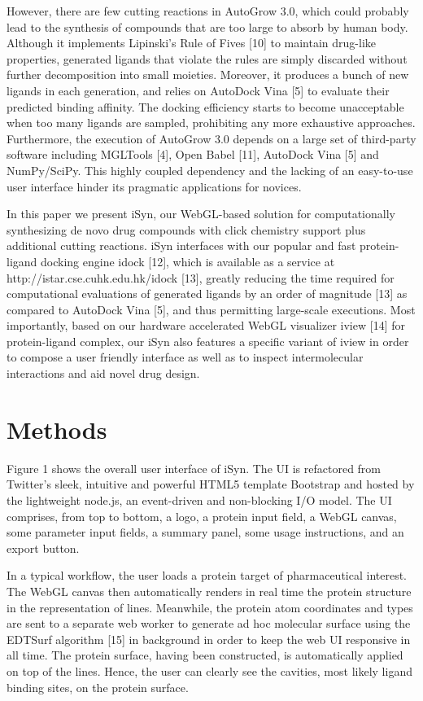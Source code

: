 However, there are few cutting reactions in AutoGrow 3.0, which could probably lead to the synthesis of compounds that are too large to absorb by human body. Although it implements Lipinski's Rule of Fives [10] to maintain drug-like properties, generated ligands that violate the rules are simply discarded without further decomposition into small moieties. Moreover, it produces a bunch of new ligands in each generation, and relies on AutoDock Vina [5] to evaluate their predicted binding affinity. The docking efficiency starts to become unacceptable when too many ligands are sampled, prohibiting any more exhaustive approaches. Furthermore, the execution of AutoGrow 3.0 depends on a large set of third-party software including MGLTools [4], Open Babel [11], AutoDock Vina [5] and NumPy/SciPy. This highly coupled dependency and the lacking of an easy-to-use user interface hinder its pragmatic applications for novices.

In this paper we present iSyn, our WebGL-based solution for computationally synthesizing de novo drug compounds with click chemistry support plus additional cutting reactions. iSyn interfaces with our popular and fast protein-ligand docking engine idock [12], which is available as a service at http://istar.cse.cuhk.edu.hk/idock [13], greatly reducing the time required for computational evaluations of generated ligands by an order of magnitude [13] as compared to AutoDock Vina [5], and thus permitting large-scale executions. Most importantly, based on our hardware accelerated WebGL visualizer iview [14] for protein-ligand complex, our iSyn also features a specific variant of iview in order to compose a user friendly interface as well as to inspect intermolecular interactions and aid novel drug design.

\section{Methods}

Figure 1 shows the overall user interface of iSyn. The UI is refactored from Twitter’s sleek, intuitive and powerful HTML5 template Bootstrap and hosted by the lightweight node.js, an event-driven and non-blocking I/O model. The UI comprises, from top to bottom, a logo, a protein input field, a WebGL canvas, some parameter input fields, a summary panel, some usage instructions, and an export button.

In a typical workflow, the user loads a protein target of pharmaceutical interest. The WebGL canvas then automatically renders in real time the protein structure in the representation of lines. Meanwhile, the protein atom coordinates and types are sent to a separate web worker to generate ad hoc molecular surface using the EDTSurf algorithm [15] in background in order to keep the web UI responsive in all time. The protein surface, having been constructed, is automatically applied on top of the lines. Hence, the user can clearly see the cavities, most likely ligand binding sites, on the protein surface.

